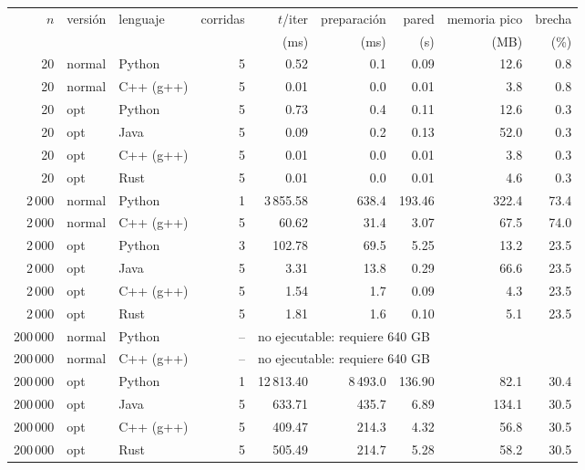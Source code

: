 \begin{tabular}{rllrrrrrr}
\toprule
$n$ & versión & lenguaje & corridas & $t$/iter & preparación & pared & memoria pico & brecha \\
 & & & & (ms) & (ms) & (s) & (MB) & (\%) \\
\midrule
20 & normal & Python & 5 & 0.52 & 0.1 & 0.09 & 12.6 & 0.8 \\
20 & normal & C++ (g++) & 5 & 0.01 & 0.0 & 0.01 & 3.8 & 0.8 \\
20 & opt & Python & 5 & 0.73 & 0.4 & 0.11 & 12.6 & 0.3 \\
20 & opt & Java & 5 & 0.09 & 0.2 & 0.13 & 52.0 & 0.3 \\
20 & opt & C++ (g++) & 5 & 0.01 & 0.0 & 0.01 & 3.8 & 0.3 \\
20 & opt & Rust & 5 & 0.01 & 0.0 & 0.01 & 4.6 & 0.3 \\
\midrule
2\,000 & normal & Python & 1 & 3\,855.58 & 638.4 & 193.46 & 322.4 & 73.4 \\
2\,000 & normal & C++ (g++) & 5 & 60.62 & 31.4 & 3.07 & 67.5 & 74.0 \\
2\,000 & opt & Python & 3 & 102.78 & 69.5 & 5.25 & 13.2 & 23.5 \\
2\,000 & opt & Java & 5 & 3.31 & 13.8 & 0.29 & 66.6 & 23.5 \\
2\,000 & opt & C++ (g++) & 5 & 1.54 & 1.7 & 0.09 & 4.3 & 23.5 \\
2\,000 & opt & Rust & 5 & 1.81 & 1.6 & 0.10 & 5.1 & 23.5 \\
\midrule
200\,000 & normal & Python & -- & \multicolumn{5}{l}{no ejecutable: requiere 640 GB} \\
200\,000 & normal & C++ (g++) & -- & \multicolumn{5}{l}{no ejecutable: requiere 640 GB} \\
200\,000 & opt & Python & 1 & 12\,813.40 & 8\,493.0 & 136.90 & 82.1 & 30.4 \\
200\,000 & opt & Java & 5 & 633.71 & 435.7 & 6.89 & 134.1 & 30.5 \\
200\,000 & opt & C++ (g++) & 5 & 409.47 & 214.3 & 4.32 & 56.8 & 30.5 \\
200\,000 & opt & Rust & 5 & 505.49 & 214.7 & 5.28 & 58.2 & 30.5 \\
\bottomrule
\end{tabular}
